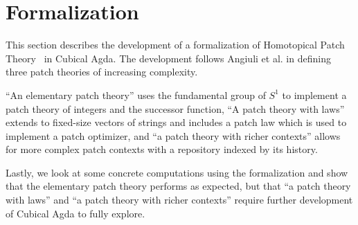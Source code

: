 \chapter{Formalization}\label{ch/formalization}

This section describes the development of a formalization of Homotopical Patch
Theory~\cite{Angiuli2016} in Cubical Agda. The development follows Angiuli et
al. in defining three patch theories of increasing complexity.

``An elementary patch theory'' uses the fundamental group of $S^1$ to implement
a patch theory of integers and the successor function, ``A patch theory with
laws'' extends to fixed-size vectors of strings and includes a patch law which
is used to implement a patch optimizer, and ``a patch theory with richer
contexts'' allows for more complex patch contexts with a repository indexed by
its history.

Lastly, we look at some concrete computations using the formalization and
show that the elementary patch theory performs as expected, but that ``a
patch theory with laws'' and ``a patch theory with richer contexts''
require further development of Cubical Agda to fully explore.